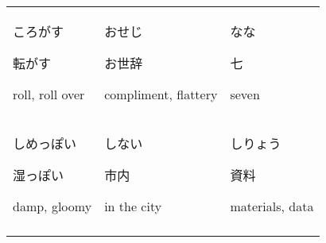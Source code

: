 \documentclass[12pt, a4j, landscape, dvipdfmx]{utarticle}
\begin{document}
\begin{minipage}[t][0pt]{\linewidth }
\begin{tabular}{||p{5.5cm}||p{5.5cm}||p{5.5cm}||}
            \hhline{|:=::=::=:|} \rule{0pt}{3ex}
            \hspace*{-.4cm} {\LARGE ころがす}\newline
            \rule{0pt}{3ex} \hspace*{.4cm} {\small
            転がす}\newline \rule{0pt}{3ex} \hspace*{.425cm}
            {\small roll, roll over}&\rule{0pt}{3ex}
            \hspace*{-.4cm} {\LARGE おせじ}\newline
            \rule{0pt}{3ex} \hspace*{.4cm} {\small
            お世辞}\newline \rule{0pt}{3ex} \hspace*{.425cm}
            {\small compliment, flattery}&\rule{0pt}{3ex}
            \hspace*{-.4cm} {\LARGE なな}\newline
            \rule{0pt}{3ex} \hspace*{.4cm} {\small
            七}\newline \rule{0pt}{3ex} \hspace*{.425cm}
            {\small seven}\tabularnewline
            \hhline{|:=::=::=:|} \rule{0pt}{3ex}
            \hspace*{-.4cm} {\LARGE しめっぽい}\newline
            \rule{0pt}{3ex} \hspace*{.4cm} {\small
            湿っぽい}\newline \rule{0pt}{3ex} \hspace*{.425cm}
            {\small damp, gloomy}&\rule{0pt}{3ex}
            \hspace*{-.4cm} {\LARGE しない}\newline
            \rule{0pt}{3ex} \hspace*{.4cm} {\small
            市内}\newline \rule{0pt}{3ex} \hspace*{.425cm}
            {\small in the city}&\rule{0pt}{3ex}
            \hspace*{-.4cm} {\LARGE しりょう}\newline
            \rule{0pt}{3ex} \hspace*{.4cm} {\small
            資料}\newline \rule{0pt}{3ex} \hspace*{.425cm}
            {\small materials, data}\tabularnewline
            \hhline{|b:=:b:=:b:=:b|} 
        \end{tabular} 
    \end{minipage} 
\end{document}
